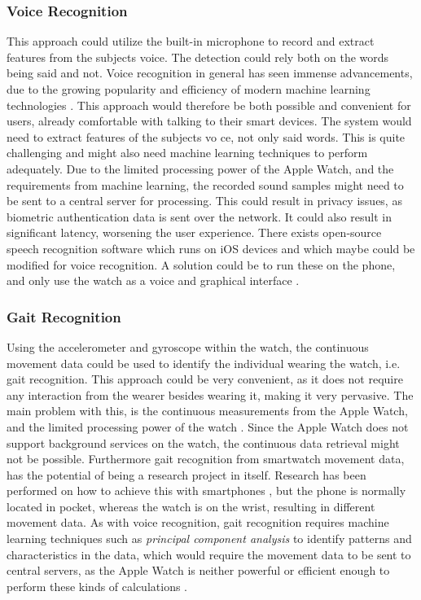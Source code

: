 \subsubsection{Voice Recognition}
This approach could utilize the built-in microphone to record and extract
features from the subjects voice. The detection could rely both on the words
being said and not. Voice recognition in general has seen immense
advancements, due to the growing popularity and efficiency of modern machine 
learning technologies \cite{6296526}. 
This approach would therefore be both possible and convenient for users, already 
comfortable with talking to their smart devices. 
The system would need to extract features of the subjects vo ce, not only said
words. This is quite challenging and might also need machine learning techniques to
perform adequately. Due to the limited processing power of the Apple Watch, and
the requirements from machine learning, the recorded sound samples might need to
be sent to a central server for processing. This could result in privacy issues,
as biometric authentication data is sent over the network. It could also result
in significant latency, worsening the user experience. There exists open-source
speech recognition software which runs on iOS devices and which maybe could be
modified for voice recognition. A solution could be to run these on the phone,
and only use the watch as a voice and graphical interface \cite{spearsite}.

\subsubsection{Gait Recognition}
Using the accelerometer and gyroscope within the watch, the continuous movement
data could be used to identify the individual wearing the watch, i.e. gait
recognition. This approach could be very convenient, as it does not require any
interaction from the wearer besides wearing it, making it very pervasive.
The main problem with this, is the continuous measurements from the Apple Watch, and the
limited processing power of the watch \cite{ferrero2015a}. Since the Apple Watch
does not support background services on the watch, the continuous data retrieval
might not be possible. Furthermore gait recognition from smartwatch movement
data, has the potential of being a research project in itself. Research has been
performed on how to achieve this with smartphones \cite{ferrero2015a}, but the 
phone is normally located in pocket, whereas the watch is on the wrist, 
resulting in different movement data. As with voice recognition, gait
recognition requires machine learning techniques such as \textit{principal
    component analysis} to identify patterns and characteristics in the data,
    which would require the movement data to be sent to central servers, as the
    Apple Watch is neither powerful or efficient enough to perform these kinds
    of calculations \cite{dawson2008a}.

